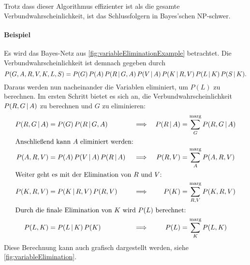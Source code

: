 			Trotz dass dieser Algorithmus effizienter ist als die gesamte Verbundwahrscheinlichkeit, ist das Schlussfolgern in Bayes'schen NP-schwer.

			\paragraph{Beispiel}
				Es wird das Bayes-Netz aus \autoref{fig:variableEliminationExample} betrachtet. Die Verbundwahrscheinlichkeit ist demnach gegeben durch
				\begin{equation}
					P(G, A, R, V, K, L, S) = P(G) \, P(A) \, P(R \,\vert\, G, A) \, P(V \,\vert\, A) \, P(K \,\vert\, R, V) \, P(L \,\vert\, K) \, P(S \,\vert\, K).
				\end{equation}
				Daraus werden nun nacheinander die Variablen eliminiert, um \( P(L) \) zu berechnen. Im ersten Schritt bietet es sich an, die Verbundwahrscheinlichkeit \( P(R, G \,\vert\, A) \) zu berechnen und \(G\) zu eliminieren:
				\begin{align}
						P(R, G \,\vert\, A) &= P(G) \, P(R \,\vert\, G, A) &
						&\implies&
						P(R \,\vert\, A) &= \sum_{G}^{\text{marg}} P(R, G \,\vert\, A) \\
					\intertext{Anschließend kann \(A\) eliminiert werden:}
						P(A, R, V) &= P(A) \, P(V \,\vert\, A) \, P(R \,\vert\, A) &
						&\implies&
						P(R, V) &= \sum_{A}^{\text{marg}} P(A, R, V) \\
					\intertext{Weiter geht es mit der Elimination von \(R\) und \(V\):}
						P(K, R, V) &= P(K \,\vert\, R, V) \, P(R, V) &
						&\implies&
						P(K) &= \sum_{R, V}^{\text{marg}} P(K, R, V) \\
					\intertext{Durch die finale Elimination von \(K\) wird \(P(L)\) berechnet:}
						P(L, K) &= P(L \,\vert\, K) \, P(K) &
						&\implies&
						P(L) &= \sum_{K}^{\text{marg}} P(L, K)
				\end{align}
				Diese Berechnung kann auch grafisch dargestellt werden, siehe \autoref{fig:variableElimination}.

